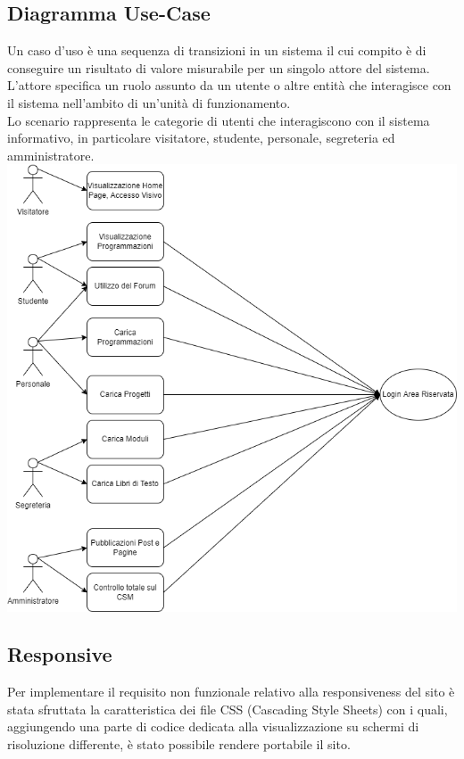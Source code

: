 \documentclass{article}
\begin{document}
	\subsection{\textbf{Diagramma Use-Case}}

	Un caso d’uso è una sequenza di transizioni in un sistema il cui compito è di conseguire un risultato di valore misurabile per un singolo attore del sistema.\\
    L’attore specifica un ruolo assunto da un utente o altre entità che interagisce con il sistema nell’ambito di un’unità di funzionamento.\\
    Lo scenario rappresenta le categorie di utenti che interagiscono con il sistema informativo, in particolare visitatore, studente, personale, segreteria ed amministratore.
	\includegraphics[scale=0.2]{usecase.drawio.png}
		
	\subsection{\textbf{Responsive}}

	Per implementare il requisito non funzionale relativo alla responsiveness del sito è stata sfruttata la caratteristica dei file CSS (Cascading Style Sheets) con i quali, aggiungendo una parte di codice dedicata alla visualizzazione su schermi di risoluzione differente, è stato possibile rendere portabile il sito.
	
\end{document}
